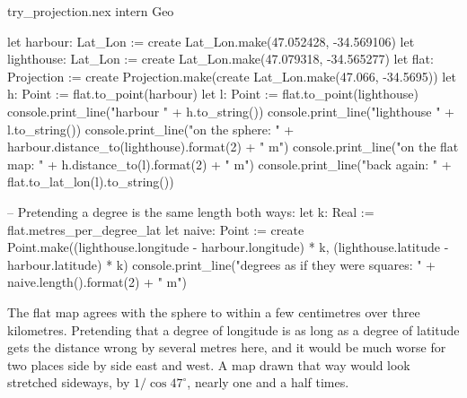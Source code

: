 \begin{tryit}{try_projection.nex}
intern Geo

let harbour: Lat_Lon := create Lat_Lon.make(47.052428, -34.569106)
let lighthouse: Lat_Lon := create Lat_Lon.make(47.079318, -34.565277)
let flat: Projection := create Projection.make(create Lat_Lon.make(47.066, -34.5695))
let h: Point := flat.to_point(harbour)
let l: Point := flat.to_point(lighthouse)
console.print_line("harbour    " + h.to_string())
console.print_line("lighthouse " + l.to_string())
console.print_line("on the sphere:   " + harbour.distance_to(lighthouse).format(2) + " m")
console.print_line("on the flat map: " + h.distance_to(l).format(2) + " m")
console.print_line("back again: " + flat.to_lat_lon(l).to_string())

-- Pretending a degree is the same length both ways:
let k: Real := flat.metres_per_degree_lat
let naive: Point := create Point.make((lighthouse.longitude - harbour.longitude) * k,
  (lighthouse.latitude - harbour.latitude) * k)
console.print_line("degrees as if they were squares: " + naive.length().format(2) + " m")
\end{tryit}

The flat map agrees with the sphere to within a few centimetres over three
kilometres. Pretending that a degree of longitude is as long as a degree of
latitude gets the distance wrong by several metres here, and it would be
much worse for two places side by side east and west. A map drawn that way
would look stretched sideways, by $1/\cos 47^\circ$, nearly one and a
half times.
